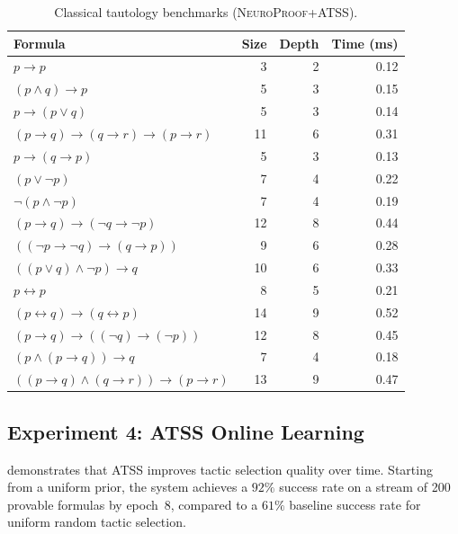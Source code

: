 \documentclass[conference]{IEEEtran}
\newcommand{\NP}{\textsc{NeuroProof}}
\newcommand{\ATSS}{\textsc{ATSS}}
\begin{document}
\begin{table}[t]
  \centering
  \caption{Classical tautology benchmarks (\NP{}+\ATSS{}).}
  \label{tab:tautologies}
  \begin{tabular}{lrrr}
    \toprule
    Formula & Size & Depth & Time (ms) \\
    \midrule
    $p \to p$                             & 3  & 2  & 0.12 \\
    $(p \wedge q) \to p$                  & 5  & 3  & 0.15 \\
    $p \to (p \vee q)$                    & 5  & 3  & 0.14 \\
    $(p \to q) \to (q \to r) \to (p \to r)$  & 11 & 6  & 0.31 \\
    $p \to (q \to p)$                     & 5  & 3  & 0.13 \\
    $(p \vee \neg p)$                     & 7  & 4  & 0.22 \\
    $\neg(p \wedge \neg p)$               & 7  & 4  & 0.19 \\
    $(p \to q) \to (\neg q \to \neg p)$   & 12 & 8  & 0.44 \\
    $((\neg p \to \neg q) \to (q \to p))$ & 9  & 6  & 0.28 \\
    $((p \vee q) \wedge \neg p) \to q$   & 10 & 6  & 0.33 \\
    $p \leftrightarrow p$                 & 8  & 5  & 0.21 \\
    $(p \leftrightarrow q) \to (q \leftrightarrow p)$   & 14 & 9  & 0.52 \\
    $(p \to q) \to ((\neg q) \to (\neg p))$  & 12 & 8  & 0.45 \\
    $(p \wedge (p \to q)) \to q$          & 7  & 4  & 0.18 \\
    $((p \to q) \wedge (q \to r)) \to (p \to r)$ & 13 & 9  & 0.47 \\
    \bottomrule
  \end{tabular}
\end{table}

\subsection{Experiment 4: ATSS Online Learning}

 demonstrates that \ATSS{} improves tactic selection
quality over time.  Starting from a uniform prior, the system achieves a $92\%$
success rate on a stream of 200 provable formulas by epoch~8, compared to a
$61\%$ baseline success rate for uniform random tactic selection.
\end{document}
